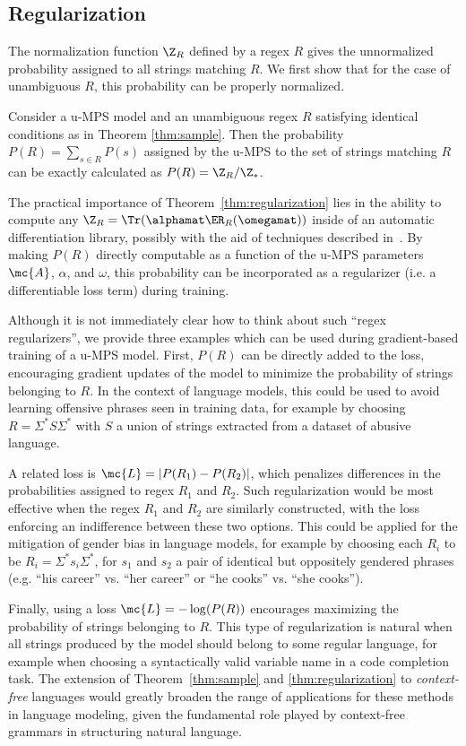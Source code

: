 \subsection{Regularization}

The normalization function $\Z_{R}$ defined by a regex $R$ gives the unnormalized probability assigned to all strings matching $R$. We first show that for the case of unambiguous $R$, this probability can be properly normalized.
%
\begin{theorem}
\label{thm:regularization}
Consider a u-MPS model and an unambiguous regex $R$ satisfying identical conditions as in Theorem \ref{thm:sample}. Then the probability $P(R) = \sum_{s \in R} P(s)$ assigned by the u-MPS to the set of strings matching $R$ can be exactly calculated as $P(R) = \Z_R / \Z_*$.
\end{theorem}
%
The practical importance of Theorem~\ref{thm:regularization} lies in the ability to compute any $\Z_R = \Tr(\alphamat \ER_R(\omegamat))$ inside of an automatic differentiation library, possibly with the aid of techniques described in~\citep{liao2019}. By making $P(R)$ directly computable as a function of the u-MPS parameters $\mc{A}$, $\alpha$, and $\omega$, this probability can be incorporated as a regularizer (i.e. a differentiable loss term) during training.

Although it is not immediately clear how to think about such ``regex regularizers'', we provide three examples which can be used during gradient-based training of a u-MPS model. First, $P(R)$ can be directly added to the loss, encouraging gradient updates of the model to minimize the probability of strings belonging to $R$. In the context of language models, this could be used to avoid learning offensive phrases seen in training data, for example by choosing $R = \Sigma^* S \Sigma^*$ with $S$ a union of strings extracted from a dataset of abusive language.

A related loss is $\mc{L} = |P(R_1) - P(R_2)|$, which penalizes differences in the probabilities assigned to regex $R_1$ and $R_2$. Such regularization would be most effective when the regex $R_1$ and $R_2$ are similarly constructed, with the loss enforcing an indifference between these two options. This could be applied for the mitigation of gender bias in language models, for example by choosing each $R_i$ to be $R_i = \Sigma^* s_i \Sigma^*$, for $s_1$ and $s_2$ a pair of identical but oppositely gendered phrases (e.g. ``his career'' vs. ``her career'' or ``he cooks'' vs. ``she cooks''). 

Finally, using a loss $\mc{L} = -\log(P(R))$ encourages maximizing the probability of strings belonging to $R$. This type of regularization is natural when all strings produced by the model should belong to some regular language, for example when choosing a syntactically valid variable name in a code completion task. The extension of Theorem~\ref{thm:sample} and \ref{thm:regularization} to \emph{context-free} languages would greatly broaden the range of applications for these methods in language modeling, given the fundamental role played by context-free grammars in structuring natural language.

